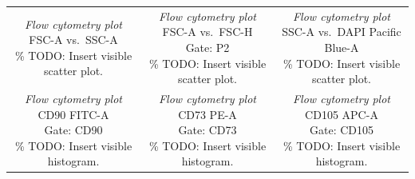 \documentclass[UTF8,10pt,a4paper,fontset=fandol]{ctexart}
\begin{document}
\begin{center}
\begin{tabular}{ccc}
\fbox{\parbox[c][3.2cm][c]{0.29\textwidth}{\centering
\textit{Flow cytometry plot}\\
FSC-A vs.\ SSC-A\\
\% TODO: Insert visible scatter plot.}}
&
\fbox{\parbox[c][3.2cm][c]{0.29\textwidth}{\centering
\textit{Flow cytometry plot}\\
FSC-A vs.\ FSC-H\\
Gate: P2\\
\% TODO: Insert visible scatter plot.}}
&
\fbox{\parbox[c][3.2cm][c]{0.29\textwidth}{\centering
\textit{Flow cytometry plot}\\
SSC-A vs.\ DAPI Pacific Blue-A\\
\% TODO: Insert visible scatter plot.}}
\\[0.5em]
\fbox{\parbox[c][3.2cm][c]{0.29\textwidth}{\centering
\textit{Flow cytometry plot}\\
CD90 FITC-A\\
Gate: CD90\\
\% TODO: Insert visible histogram.}}
&
\fbox{\parbox[c][3.2cm][c]{0.29\textwidth}{\centering
\textit{Flow cytometry plot}\\
CD73 PE-A\\
Gate: CD73\\
\% TODO: Insert visible histogram.}}
&
\fbox{\parbox[c][3.2cm][c]{0.29\textwidth}{\centering
\textit{Flow cytometry plot}\\
CD105 APC-A\\
Gate: CD105\\
\% TODO: Insert visible histogram.}}
\end{tabular}
\end{center}

\vspace{1em}
\end{document}
